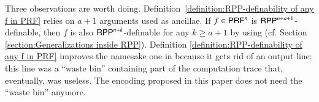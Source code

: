 Three observations are worth doing.
Definition~\ref{definition:RPP-definability of any f in PRF} relies on $a+1$ arguments used as ancillae.
If $ f\in\mathsf{P}\mathsf{RF}^n $ is $ \mathsf{RPP}^{n+a+1} $-definable, then $f$ is also
$ \mathsf{RPP}^{n+k} $-definable for any $k\geq a+1$ by using \rprWeaName (cf. Section \ref{section:Generalizations inside RPP}).
Definition \ref{definition:RPP-definability of any f in PRF} improves 
the namesake one in \cite[Def.3.1, p.236]{PaoliniPiccoloRoversiICTCS2015} because it gets rid of an output
line:  this line was a ``waste bin'' containing part of the computation trace that, eventually, was useless. 
The encoding proposed in this paper does not need the ``waste bin'' anymore.
